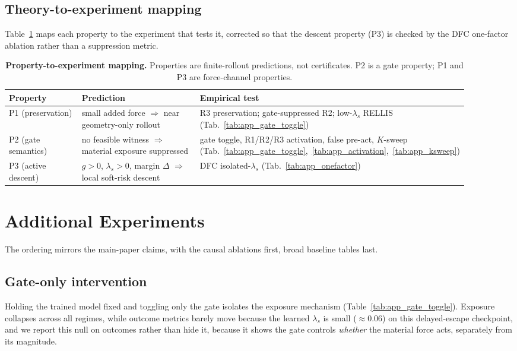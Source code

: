 \subsection{Theory-to-experiment mapping}
\label{app:theory_map}
Table~\ref{tab:app_theory_checks} maps each property to the experiment that
tests it, corrected so that the descent property (P3) is checked by the DFC
one-factor ablation rather than a suppression metric.

\begin{table}[htbp]
\centering
\caption{\textbf{Property-to-experiment mapping.} Properties are finite-rollout
predictions, not certificates. P2 is a gate property; P1 and P3 are force-channel
properties.}
\label{tab:app_theory_checks}
\small
\begin{tabular}{p{0.18\linewidth}p{0.36\linewidth}p{0.36\linewidth}}
\toprule
Property & Prediction & Empirical test \\
\midrule
P1 (preservation) & small added force $\Rightarrow$ near geometry-only rollout
  & R3 preservation; gate-suppressed R2; low-$\lambda_s$ RELLIS
    (Tab.~\ref{tab:app_gate_toggle}) \\
P2 (gate semantics) & no feasible witness $\Rightarrow$ material exposure suppressed
  & gate toggle, R1/R2/R3 activation, false pre-act, $K$-sweep
    (Tab.~\ref{tab:app_gate_toggle},~\ref{tab:app_activation},~\ref{tab:app_ksweep}) \\
P3 (active descent) & $g{>}0$, $\lambda_s{>}0$, margin $\Delta$ $\Rightarrow$ local soft-risk descent
  & DFC isolated-$\lambda_s$ (Tab.~\ref{tab:app_onefactor}) \\
\bottomrule
\end{tabular}
\end{table}

\section{Additional Experiments}
\label{app:additional_experiments}
The ordering mirrors the main-paper claims, with the causal ablations first, broad
baseline tables last.

\subsection{Gate-only intervention}
\label{app:gate_toggle}
\label{app:gate_toggle_sub}
Holding the trained model fixed and toggling only the gate isolates the
exposure mechanism (Table~\ref{tab:app_gate_toggle}). Exposure collapses across
all regimes, while outcome metrics barely move because the learned $\lambda_s$
is small ($\approx0.06$) on this delayed-escape checkpoint, and we report this
null on outcomes rather than hide it, because it shows the gate controls \emph{whether}
the material force acts, separately from its magnitude.

